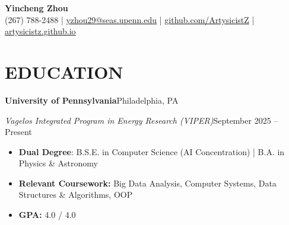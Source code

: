 \documentclass[10pt,letterpaper]{article}
\newcommand{\ressection}[1]{\section*{#1}}
\newcommand{\resheading}[4]{%
    \textbf{#1}\hfill #2\par
    \textit{#3}\hfill #4\par
}
\begin{document}
\fontsize{10.5pt}{11.8pt}\selectfont

\begin{center}
    {\LARGE \textbf{Yincheng Zhou}} \\[2pt]
    (267) 788-2488 | \href{mailto:yzhou29@seas.upenn.edu}{yzhou29@seas.upenn.edu} | \href{https://github.com/ArtysicistZ}{github.com/ArtysicistZ} | \href{https://artysicistz.github.io}{artysicistz.github.io}
\end{center}
\vspace{-8pt}

\ressection{EDUCATION}
\vspace{2pt}
\resheading{University of Pennsylvania}{Philadelphia, PA}{Vagelos Integrated Program in Energy Research (VIPER)}{September 2025 -- Present}
\begin{itemize}
    \item \textbf{Dual Degree}: B.S.E. in Computer Science (AI Concentration) | B.A. in Physics \& Astronomy
    \item \textbf{Relevant Coursework:} Big Data Analysis, Computer Systems, Data Structures \& Algorithms, OOP
    \item \textbf{GPA:} 4.0 / 4.0
\end{itemize}
\end{document}
